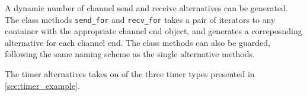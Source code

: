 A dynamic number of channel send and receive alternatives can be generated. The class methods \lstinline[style={CustomC++}]|send_for| and \lstinline[style={CustomC++}]|recv_for| takes a pair of iterators to any container with the appropriate channel end object, and generates a correposnding alternative for each channel end. The class methods can also be guarded, following the same naming scheme as the single alternative methods. 

The timer alternatives takes on of the three timer types presented in \cref{sec:timer_example}. 

